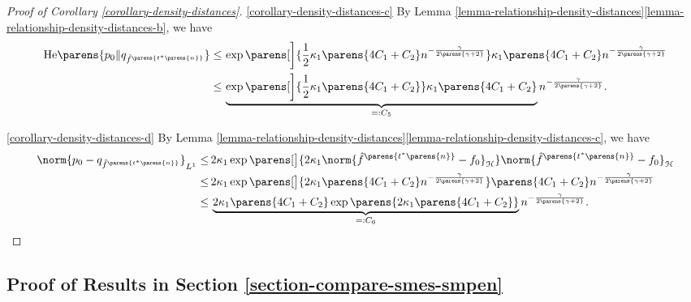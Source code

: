 \begin{proof}[Proof of Corollary \ref{corollary-density-distances}]
	\ref{corollary-density-distances-c} By Lemma \ref{lemma-relationship-density-distances}\ref{lemma-relationship-density-distances-b}, we have
	\begin{align*}
		\mathrm{He} \parens{p_0 \Vert q_{\hat{f}^{\parens{t^* \parens{n}}}} } \le & \, \exp \parens[\bigg]{\frac{1}{2} \kappa_1 \parens{4C_1 + C_2} n^{-\frac{\gamma}{2 \parens{\gamma + 2}}}} \kappa_1 \parens{4C_1 + C_2} n^{-\frac{\gamma}{2 \parens{\gamma + 2}}} \\ 
	    \le & \, \underbrace{\exp \parens[\bigg]{\frac{1}{2} \kappa_1 \parens{4C_1 + C_2}} \kappa_1 \parens{4C_1 + C_2}}_{=: C_5} n^{-\frac{\gamma}{2 \parens{\gamma + 2}}}. 
	\end{align*}
	
	\ref{corollary-density-distances-d} By Lemma \ref{lemma-relationship-density-distances}\ref{lemma-relationship-density-distances-c}, we have
	\begin{align*}
		\norm{p_0 - q_{\hat{f}^{\parens{t^* \parens{n}}}}}_{L^1} \le & \, 2 \kappa_1 \exp \parens[\big]{2 \kappa_1 \norm{ \hat{f}^{\parens{t^* \parens{n}}} - f_0}_{\hil}} \norm{ \hat{f}^{\parens{t^* \parens{n}}} - f_0}_{\hil} \\ 
		\le & \, 2 \kappa_1 \exp \parens[\big]{2 \kappa_1 \parens{4C_1 + C_2} n^{-\frac{\gamma}{2 \parens{\gamma + 2}}}} \parens{4C_1 + C_2} n^{-\frac{\gamma}{2 \parens{\gamma + 2}}} \\ 
		\le & \, \underbrace{2 \kappa_1 \parens{4C_1 + C_2} \exp \parens{2 \kappa_1 \parens{4 C_1 + C_2}}}_{=: C_6} n^{-\frac{\gamma}{2 \parens{\gamma + 2}}}. 
	\end{align*}
\end{proof}


\subsection{Proof of Results in Section \ref{section-compare-smes-smpen}} \label{proof-thm-limiting-density-lambda}


